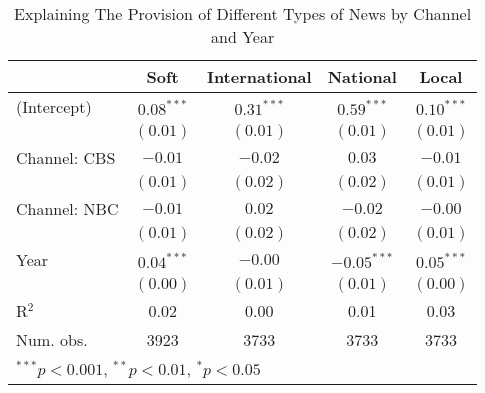 
\begin{table}
\caption{Explaining The Provision of Different Types of News by Channel and Year}
\begin{center}
\begin{tabular}{l c c c c }
\hline
 & Soft & International & National & Local \\
\hline
(Intercept)  & $0.08^{***}$ & $0.31^{***}$ & $0.59^{***}$  & $0.10^{***}$ \\
             & $(0.01)$     & $(0.01)$     & $(0.01)$      & $(0.01)$     \\
Channel: CBS & $-0.01$      & $-0.02$      & $0.03$        & $-0.01$      \\
             & $(0.01)$     & $(0.02)$     & $(0.02)$      & $(0.01)$     \\
Channel: NBC & $-0.01$      & $0.02$       & $-0.02$       & $-0.00$      \\
             & $(0.01)$     & $(0.02)$     & $(0.02)$      & $(0.01)$     \\
Year         & $0.04^{***}$ & $-0.00$      & $-0.05^{***}$ & $0.05^{***}$ \\
             & $(0.00)$     & $(0.01)$     & $(0.01)$      & $(0.00)$     \\
\hline
R$^2$        & 0.02         & 0.00         & 0.01          & 0.03         \\
Num. obs.    & 3923         & 3733         & 3733          & 3733         \\
\hline
\multicolumn{5}{l}{\scriptsize{$^{***}p<0.001$, $^{**}p<0.01$, $^*p<0.05$}}
\end{tabular}
\label{tab:news_over_time}
\end{center}
\end{table}
